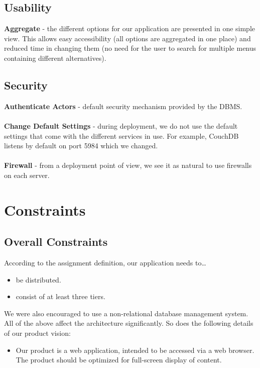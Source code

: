\subsection{Usability}
\textbf{Aggregate} - the different options for our application are presented in
one simple view. This allows easy accessibility (all options are aggregated in
one place) and reduced time in changing them (no need for the user to search for
multiple menus containing different alternatives).

\subsection{Security}
\textbf{Authenticate Actors} - default security mechanism provided by the DBMS.
\\ \\
\textbf{Change Default Settings} - during deployment, we do not use the default
settings that come with the different services in use. For example, CouchDB
listens by default on port 5984 which we changed. \\ \\
\textbf{Firewall} - from a deployment point of view, we see it as natural to
use firewalls on each server.

\section{Constraints}

\subsection {Overall Constraints}
According to the assignment definition, our application needs to\dots
\begin{itemize}
  \item be distributed.
  \item consist of at least three tiers.
\end{itemize}
We were also encouraged to use a non-relational database management system.
\newline
All of the above affect the architecture significantly. So does the following
details of our product vision:
\begin{itemize}
   \item Our product is a web application, intended to be accessed via a web
    browser. The product should be optimized for full-screen display of content.
\end{itemize}

